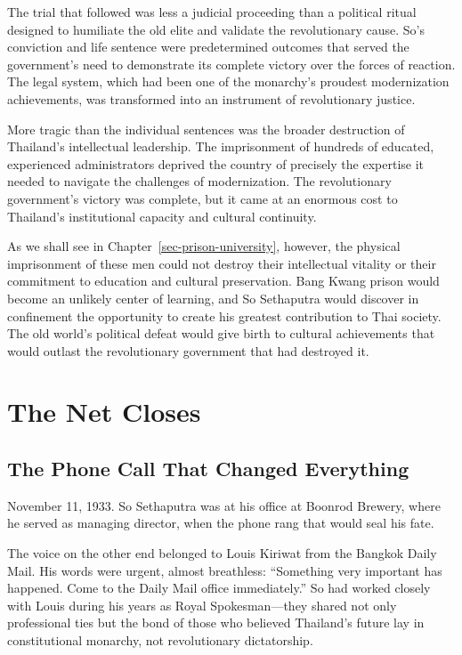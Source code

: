\documentclass[
  Letterpaper,
]{scrbook}
\begin{document}
The trial that followed was less a judicial proceeding than a political
ritual designed to humiliate the old elite and validate the
revolutionary cause. So's conviction and life sentence were
predetermined outcomes that served the government's need to demonstrate
its complete victory over the forces of reaction. The legal system,
which had been one of the monarchy's proudest modernization
achievements, was transformed into an instrument of revolutionary
justice.

More tragic than the individual sentences was the broader destruction of
Thailand's intellectual leadership. The imprisonment of hundreds of
educated, experienced administrators deprived the country of precisely
the expertise it needed to navigate the challenges of modernization. The
revolutionary government's victory was complete, but it came at an
enormous cost to Thailand's institutional capacity and cultural
continuity.

As we shall see in Chapter~\ref{sec-prison-university}, however, the
physical imprisonment of these men could not destroy their intellectual
vitality or their commitment to education and cultural preservation.
Bang Kwang prison would become an unlikely center of learning, and So
Sethaputra would discover in confinement the opportunity to create his
greatest contribution to Thai society. The old world's political defeat
would give birth to cultural achievements that would outlast the
revolutionary government that had destroyed it.


\chapter{The Net Closes}\label{sec-net-closes}

\section{The Phone Call That Changed
Everything}\label{the-phone-call-that-changed-everything}

November 11, 1933. So Sethaputra was at his office at Boonrod Brewery,
where he served as managing director, when the phone rang that would
seal his fate.

The voice on the other end belonged to Louis Kiriwat from the Bangkok
Daily Mail. His words were urgent, almost breathless: ``Something very
important has happened. Come to the Daily Mail office immediately.'' So
had worked closely with Louis during his years as Royal Spokesman---they
shared not only professional ties but the bond of those who believed
Thailand's future lay in constitutional monarchy, not revolutionary
dictatorship.
\end{document}
